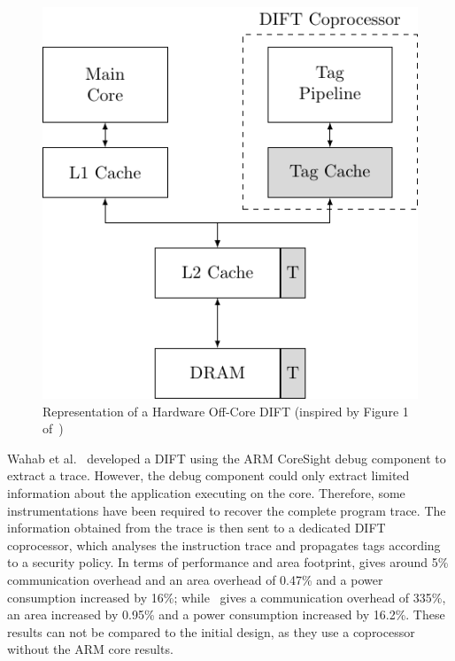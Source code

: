 \begin{figure}[ht]
    \centering
    \includegraphics{c2_soa/img/offcore.pdf}
    \caption{Representation of a Hardware Off-Core DIFT (inspired by Figure 1 of~\cite{KDK-09-dsn})}
    \label{fig:offcore_dift}
\end{figure}

Wahab et al.~\cite{WCAHBLG-18-reconfig,WCAHLG-17-fpl} developed a DIFT using the ARM CoreSight debug component to extract a trace.
However, the debug component could only extract limited information about the application executing on the core. Therefore, some instrumentations have been required to recover the complete program trace. The information obtained from the trace is then sent to a dedicated DIFT coprocessor, which analyses the instruction trace and propagates tags according to a security policy. In terms of performance and area footprint, \cite{WCAHLG-17-fpl} gives around 5\% communication overhead and an area overhead of 0.47\% and a power consumption increased by 16\%; while~\cite{WCAHBLG-18-reconfig} gives a communication overhead of 335\%, an area increased by 0.95\% and a power consumption increased by 16.2\%. These results can not be compared to the initial design, as they use a coprocessor without the ARM core results.

